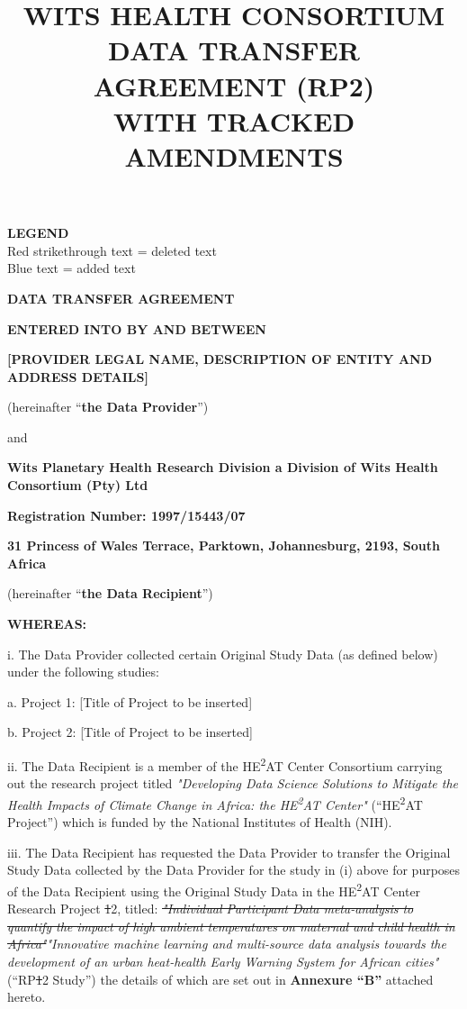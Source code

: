 \documentclass[12pt,letterpaper]{article}
\title{\textbf{WITS HEALTH CONSORTIUM\\DATA TRANSFER AGREEMENT (RP2)\\WITH TRACKED AMENDMENTS}}
\author{}
\date{}
\newcommand{\deleted}[1]{\textcolor{deletecolor}{\sout{#1}}}
\newcommand{\added}[1]{\textcolor{addcolor}{#1}}
\begin{document}
\maketitle

\begin{center}
\textbf{LEGEND}\\
\textcolor{deletecolor}{Red strikethrough text} = deleted text\\
\textcolor{addcolor}{Blue text} = added text
\end{center}

\vspace{1cm}

\textbf{DATA TRANSFER AGREEMENT}

\textbf{ENTERED INTO BY AND BETWEEN}

\textbf{[PROVIDER LEGAL NAME, DESCRIPTION OF ENTITY AND ADDRESS DETAILS]}

(hereinafter ``\textbf{the Data Provider}'')

and

\textbf{Wits Planetary Health Research Division a Division of Wits Health Consortium (Pty) Ltd}

\textbf{Registration Number: 1997/15443/07}

\textbf{31 Princess of Wales Terrace, Parktown, Johannesburg, 2193, South Africa}

(hereinafter ``\textbf{the Data Recipient}'')

\textbf{WHEREAS:}

i. The Data Provider collected certain Original Study Data (as defined below) under the following studies:

a. Project 1: [Title of Project to be inserted]

b. Project 2: [Title of Project to be inserted]

ii. The Data Recipient is a member of the HE\textsuperscript{2}AT Center Consortium carrying out the research project titled \textit{"Developing Data Science Solutions to Mitigate the Health Impacts of Climate Change in Africa: the HE\textsuperscript{2}AT Center"} (``HE\textsuperscript{2}AT Project'') which is funded by the National Institutes of Health (NIH).

iii. The Data Recipient has requested the Data Provider to transfer the Original Study Data collected by the Data Provider for the study in (i) above for purposes of the Data Recipient using the Original Study Data in the HE\textsuperscript{2}AT Center Research Project \deleted{1}\added{2}, titled: \deleted{\textit{"Individual Participant Data meta-analysis to quantify the impact of high ambient temperatures on maternal and child health in Africa"}}\added{\textit{"Innovative machine learning and multi-source data analysis towards the development of an urban heat-health Early Warning System for African cities"}} (``RP\deleted{1}\added{2} Study'') the details of which are set out in \textbf{Annexure ``B''} attached hereto.
\end{document}
